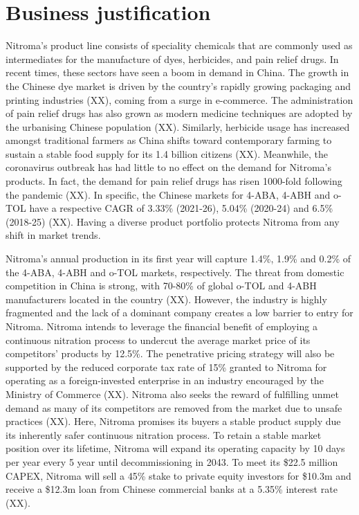 \section*{Business justification}


Nitroma’s product line consists of speciality chemicals that are commonly used as intermediates for the manufacture of dyes, herbicides, and pain relief drugs. In recent times, these sectors have seen a boom in demand in China. The growth in the Chinese dye market is driven by the country’s rapidly growing packaging and printing industries (XX), coming from a surge in e-commerce. The administration of pain relief drugs has also grown as modern medicine techniques are adopted by the urbanising Chinese population (XX). Similarly, herbicide usage has increased amongst traditional farmers as China shifts toward contemporary farming to sustain a stable food supply for its 1.4 billion citizens (XX). Meanwhile, the coronavirus outbreak has had little to no effect on the demand for Nitroma’s products. In fact, the demand for pain relief drugs has risen 1000-fold following the pandemic (XX). In specific, the Chinese markets for 4-ABA, 4-ABH and o-TOL have a respective CAGR of 3.33\% (2021-26), 5.04\% (2020-24) and 6.5\% (2018-25) (XX). Having a diverse product portfolio protects Nitroma from any shift in market trends.

Nitroma’s annual production in its first year will capture 1.4\%, 1.9\% and 0.2\% of the 4-ABA, 4-ABH and o-TOL markets, respectively. The threat from domestic competition in China is strong, with 70-80\% of global o-TOL and 4-ABH manufacturers located in the country (XX). However, the industry is highly fragmented and the lack of a dominant company creates a low barrier to entry for Nitroma. Nitroma intends to leverage the financial benefit of employing a continuous nitration process to undercut the average market price of its competitors’ products by 12.5\%.  The penetrative pricing strategy will also be supported by the reduced corporate tax rate of 15\% granted to Nitroma for operating as a foreign-invested enterprise in an industry encouraged by the Ministry of Commerce (XX). Nitroma also seeks the reward of fulfilling unmet demand as many of its competitors are removed from the market due to unsafe practices (XX). Here, Nitroma promises its buyers a stable product supply due its inherently safer continuous nitration process. To retain a stable market position over its lifetime, Nitroma will expand its operating capacity by 10 days per year every 5 year until decommissioning in 2043. To meet its \$22.5 million CAPEX, Nitroma will sell a 45\% stake to private equity investors for \$10.3m and receive a \$12.3m loan from Chinese commercial banks at a 5.35\% interest rate (XX).

